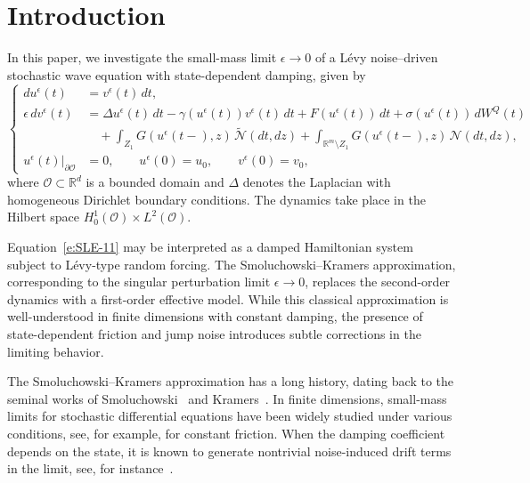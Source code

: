 \documentclass[11pt]{article}
\theoremstyle{plain}
\numberwithin{equation}{section}
\begin{document}


\section{Introduction}

In this paper, we investigate the small-mass limit $\epsilon \to 0$ of a L\'evy noise–driven stochastic wave equation with state-dependent damping, given by
\begin{equation}\label{e:SLE-11}
\left\{
\begin{aligned}
du^\epsilon(t) &=v^\epsilon(t)\,dt,\\
\epsilon\,dv^\epsilon(t) &=\Delta u^\epsilon(t)\,dt-\gamma(u^\epsilon(t))v^\epsilon(t)\,dt+F(u^\epsilon(t))\,dt+\sigma(u^\epsilon(t))\,dW^Q(t)\\
&\quad +\int_{Z_1}G(u^\epsilon(t-),z)\,\tilde{\mathcal N}(dt,dz) +\int_{\mathbb R^m\setminus Z_1} G(u^\epsilon(t-),z)\,\mathcal N(dt,dz),\\
u^\epsilon(t)|_{\partial\mathcal O}&=0,\qquad u^\epsilon(0)=u_0,\qquad v^\epsilon(0)=v_0 ,
\end{aligned}
\right.
\end{equation}
where $\mathcal{O} \subset \mathbb{R}^d$ is a bounded domain and
$\Delta$ denotes the Laplacian with homogeneous Dirichlet boundary conditions. The dynamics take place in the Hilbert space $H^1_0(\mathcal{O}) \times L^2(\mathcal{O})$.

Equation~\eqref{e:SLE-11} may be interpreted as a damped Hamiltonian system subject to L\'evy-type random forcing. The Smoluchowski--Kramers approximation, corresponding to the singular perturbation limit $\epsilon \to 0$, replaces the second-order dynamics with a first-order effective model. While this classical approximation is well-understood in finite dimensions with constant damping, the presence of state-dependent friction and jump noise introduces subtle corrections in the limiting behavior.

The Smoluchowski--Kramers approximation has a long history, dating back to the seminal works of Smoluchowski~\cite{Smoluchowski} and Kramers~\cite{Kramers}.
In finite dimensions, small-mass limits for stochastic differential equations have been widely studied under various conditions, see, for example,
\cite{MF, KS} for constant friction.  When the damping coefficient depends on the state, it is known to generate
nontrivial noise-induced drift terms in the limit, see, for instance~\cite{MWHu,Herzog,shamgv:smklim}.
 
\end{document}
